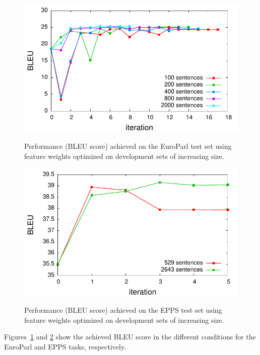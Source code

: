 \documentclass[10pt]{report}
\theoremstyle{plain}
\begin{document}
{\begin{figure}
\begin{center}
\label{fig:MERT-europarl-devsize}
 \includegraphics[width=\columnwidth]{europarl-devsize}
\caption{Performance (BLEU score) achieved on the EuroParl test set using feature weights optimized on  development sets of increasing size.}
\end{center}
 \end{figure}


\begin{figure}
\begin{center}
\label{fig:MERT-epps-devsize}
 \includegraphics[width=\columnwidth]{epps-cn-devsize}
\caption{Performance (BLEU score) achieved on the EPPS test set using feature weights optimized on  development sets of increasing size.}
\end{center}
 \end{figure}

Figures~\ref{fig:MERT-europarl-devsize} and \ref{fig:MERT-epps-devsize} show the achieved BLEU score in the different conditions for the EuroParl and EPPS tasks, respectively.

}
\end{document}
